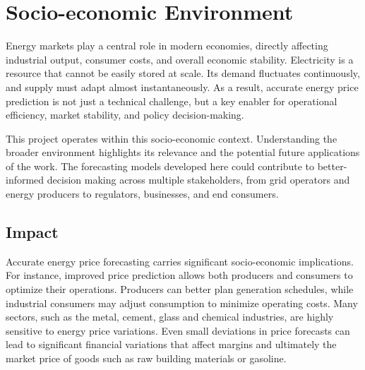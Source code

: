\documentclass[12pt]{report} %
\begin{document}





\chapter{Socio-economic Environment}
\label{chap:06}
Energy markets play a central role in modern economies, directly affecting industrial output, consumer costs, and overall economic stability. Electricity is a resource that cannot be easily stored at scale. Its demand fluctuates continuously, and supply must adapt almost instantaneously. As a result, accurate energy price prediction is not just a technical challenge, but a key enabler for operational efficiency, market stability, and policy decision-making.

This project operates within this socio-economic context. Understanding the broader environment highlights its relevance and the potential future applications of the work. The forecasting models developed here could contribute to better-informed decision making across multiple stakeholders, from grid operators and energy producers to regulators, businesses, and end consumers.


\section{Impact}

Accurate energy price forecasting carries significant socio-economic implications. For instance, improved price prediction allows both producers and consumers to optimize their operations. Producers can better plan generation schedules, while industrial consumers may adjust consumption to minimize operating costs. Many sectors, such as the metal, cement, glass and chemical industries, are highly sensitive to energy price variations. Even small deviations in price forecasts can lead to significant financial variations that affect margins and ultimately the market price of goods such as raw building materials or gasoline.
\end{document}
